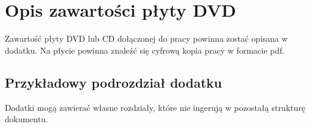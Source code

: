 \chapter{Opis zawartości płyty DVD}

Zawartość płyty DVD lub CD dołączonej do pracy powinna zostać opisana w dodatku. Na płycie powinna znaleźć się cyfrową kopia pracy w formacie pdf.

\section{Przykładowy podrozdział dodatku}
\label{sec:dvd:przyk}
Dodatki mogą zawierać własne rozdziały, które nie ingerują w pozostałą strukturę dokumentu.
